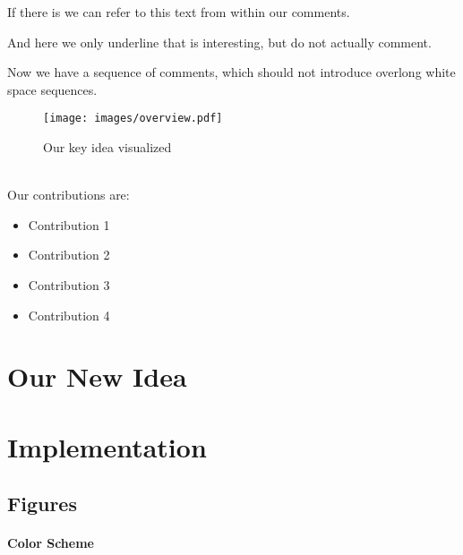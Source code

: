 \documentclass[sigplan,\review anonymous]{acmart}
\begin{document}
If there is  we can refer to this text from within our comments.

And here we only underline \authorTwo[Text]{} that is interesting, but do not
actually comment.

Now we have a sequence of comments,
which should not introduce overlong white space sequences.

\lipsum[1-3]

\begin{figure}
%
\texttt{[image: images/overview.pdf]}
\caption{Our key idea visualized}
\end{figure}

~\\
Our contributions are:
\begin{itemize}
	\item Contribution 1
	\item Contribution 2
	\item Contribution 3
	\item Contribution 4
\end{itemize}

\section{Our New Idea}

\lipsum[1-3]

\section{Implementation}

\subsection{Figures}

\paragraph{Color Scheme} 
\end{document}
